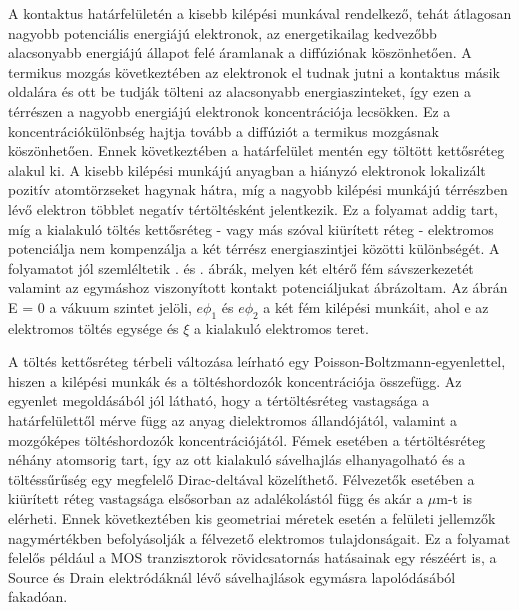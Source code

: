 A kontaktus határfelületén a kisebb kilépési munkával rendelkező, tehát átlagosan nagyobb potenciális energiájú elektronok, az energetikailag kedvezőbb alacsonyabb energiájú állapot felé áramlanak a diffúziónak köszönhetően. A termikus mozgás következtében az elektronok el tudnak jutni a kontaktus másik oldalára és ott be tudják tölteni az alacsonyabb energiaszinteket, így ezen a térrészen a nagyobb energiájú elektronok koncentrációja lecsökken. Ez a koncentrációkülönbség hajtja tovább a diffúziót a termikus mozgásnak köszönhetően. Ennek következtében a határfelület mentén egy töltött kettősréteg alakul ki. A kisebb kilépési munkájú anyagban a hiányzó elektronok lokalizált pozitív atomtörzseket hagynak hátra, míg a nagyobb kilépési munkájú térrészben lévő elektron többlet negatív tértöltésként jelentkezik. Ez a folyamat addig tart, míg a kialakuló töltés kettősréteg - vagy más szóval kiürített réteg - elektromos potenciálja nem kompenzálja a két térrész energiaszintjei közötti különbségét.\cite{mizsei} A folyamatot jól szemléltetik . és . ábrák, melyen két eltérő fém sávszerkezetét valamint az egymáshoz viszonyított kontakt potenciáljukat ábrázoltam. Az ábrán E = 0 a vákuum szintet jelöli, $e\phi_1$ és $e\phi_2$ a két fém kilépési munkáit, ahol e az elektromos töltés egysége és $\xi$ a kialakuló elektromos teret.


A töltés kettősréteg térbeli változása leírható egy Poisson-Boltzmann-egyenlettel, hiszen a kilépési munkák és a töltéshordozók koncentrációja összefügg\cite{Garrett_Brattain}. Az egyenlet megoldásából jól látható\cite{poisson-boltzmann}, hogy a tértöltésréteg vastagsága a határfelülettől mérve függ az anyag dielektromos állandójától, valamint a mozgóképes töltéshordozók koncentrációjától. Fémek esetében a tértöltésréteg néhány atomsorig tart, így az ott kialakuló sávelhajlás elhanyagolható és a töltéssűrűség egy megfelelő Dirac-deltával közelíthető. Félvezetők esetében a kiürített réteg vastagsága elsősorban az adalékolástól függ és akár a $\mu$m-t is elérheti. Ennek következtében kis geometriai méretek esetén a felületi jellemzők nagymértékben befolyásolják a félvezető elektromos tulajdonságait.\cite{mizsei} Ez a folyamat felelős például a MOS tranzisztorok rövidcsatornás hatásainak egy részéért is, a Source és Drain elektródáknál lévő sávelhajlások egymásra lapolódásából fakadóan\cite{poisson-boltzmann}.

